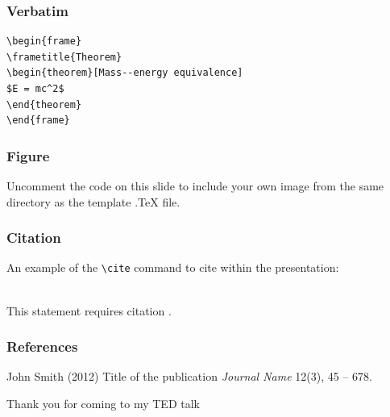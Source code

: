 \documentclass{beamer}
\begin{document}

\begin{frame}[fragile] %
\frametitle{Verbatim}
\begin{example}
\begin{verbatim}
\begin{frame}
\frametitle{Theorem}
\begin{theorem}[Mass--energy equivalence]
$E = mc^2$
\end{theorem}
\end{frame}\end{verbatim}
\end{example}
\end{frame}


\begin{frame}
\frametitle{Figure}
Uncomment the code on this slide to include your own image from the same directory as the template .TeX file.
\end{frame}


\begin{frame}[fragile] %
\frametitle{Citation}
An example of the \verb|\cite| command to cite within the presentation:\\~

This statement requires citation \cite{p1}.
\end{frame}


\begin{frame}
\frametitle{References}
\footnotesize{
\begin{thebibliography}{99} %
 John Smith (2012)
\newblock Title of the publication
\newblock \emph{Journal Name} 12(3), 45 -- 678.
\end{thebibliography}
}
\end{frame}


\begin{frame}
\huge{\centerline{Thank you for coming to my TED talk}}
\end{frame}

\end{document}
